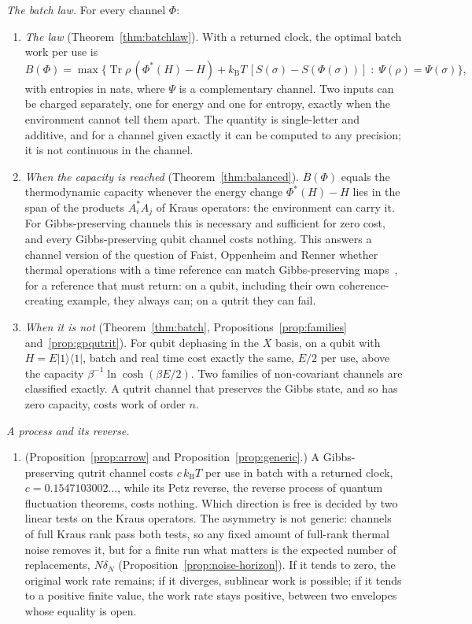 \documentclass[11pt]{article}
\theoremstyle{definition}
\theoremstyle{remark}
\newcommand{\Tr}{\operatorname{Tr}}
\newcommand{\kB}{k_{\mathrm B}}
\begin{document}
\emph{The batch law.} For every channel $\Phi$:
\begin{enumerate}[label=(\roman*),resume]
\item \emph{The law} (Theorem~\ref{thm:batchlaw}). With a returned clock, the optimal batch work per use is
\[
B(\Phi)=\max\bigl\{\Tr\rho\,(\Phi^*(H)-H)+\kB T\,[S(\sigma)-S(\Phi(\sigma))]\;:\;\Psi(\rho)=\Psi(\sigma)\bigr\},
\]
with entropies in nats, where $\Psi$ is a complementary channel. Two inputs can be charged separately, one for energy and one for entropy, exactly when the environment cannot tell them apart. The quantity is single-letter and additive, and for a channel given exactly it can be computed to any precision; it is not continuous in the channel.
\item \emph{When the capacity is reached} (Theorem~\ref{thm:balanced}). $B(\Phi)$ equals the thermodynamic capacity whenever the energy change $\Phi^*(H)-H$ lies in the span of the products $A_i^*A_j$ of Kraus operators: the environment can carry it. For Gibbs-preserving channels this is necessary and sufficient for zero cost, and every Gibbs-preserving qubit channel costs nothing. This answers a channel version of the question of Faist, Oppenheim and Renner whether thermal operations with a time reference can match Gibbs-preserving maps~\cite{FOR15}, for a reference that must return: on a qubit, including their own coherence-creating example, they always can; on a qutrit they can fail.
\item \emph{When it is not} (Theorem~\ref{thm:batch}, Propositions~\ref{prop:families} and~\ref{prop:gpqutrit}). For qubit dephasing in the $X$ basis, on a qubit with $H=E|1\rangle\langle1|$, batch and real time cost exactly the same, $E/2$ per use, above the capacity $\beta^{-1}\ln\cosh(\beta E/2)$. Two families of non-covariant channels are classified exactly. A qutrit channel that preserves the Gibbs state, and so has zero capacity, costs work of order $n$.
\end{enumerate}

\emph{A process and its reverse.}
\begin{enumerate}[label=(\roman*),resume]
\item (Proposition~\ref{prop:arrow} and Proposition~\ref{prop:generic}.) A Gibbs-preserving qutrit channel costs $c\,\kB T$ per use in batch with a returned clock, $c=0.1547103002\ldots$, while its Petz reverse, the reverse process of quantum fluctuation theorems, costs nothing. Which direction is free is decided by two linear tests on the Kraus operators. The asymmetry is not generic: channels of full Kraus rank pass both tests, so any fixed amount of full-rank thermal noise removes it, but for a finite run what matters is the expected number of replacements, $N\delta_N$ (Proposition~\ref{prop:noise-horizon}). If it tends to zero, the original work rate remains; if it diverges, sublinear work is possible; if it tends to a positive finite value, the work rate stays positive, between two envelopes whose equality is open.
\end{enumerate}
\end{document}
